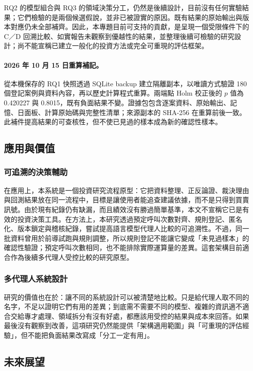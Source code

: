 \documentclass[12pt,a4paper]{article}
\numberwithin{table}{section}
\numberwithin{figure}{section}
\begin{document}
RQ2 的模型組合與 RQ3 的領域決策分工，仍然是後續設計，目前沒有任何實驗結果；它們檢驗的是兩個候選假說，並非已被證實的原因。既有結果的原始輸出與版本對應仍未全部補齊。因此，本專題目前可支持的貢獻，是呈現一個受限條件下的 C／D 回溯比較、如實報告未觀察到優越性的結果，並整理後續可檢驗的研究設計；尚不能宣稱已建立一般化的投資方法或完全可重現的評估框架。

\paragraph{2026 年 10 月 15 日重算補記。} 從本機保存的 RQ1 快照透過 SQLite backup 建立隔離副本，以唯讀方式驗證 180 個登記案例與資料內容，再以歷史計算程式重算。兩端點 Holm 校正後的 $p$ 值為 0.420227 與 0.8015，既有負面結果不變。證據包包含逐案資料、原始輸出、記憶、日面板、計算原始碼與完整性清單；來源副本的 SHA-256 在重算前後一致。此補件提高結果的可查核性，但不使已見過的樣本成為新的確認性樣本。

\subsection{應用與價值}

\subsubsection{可追溯的決策輔助}
在應用上，本系統是一個投資研究流程原型：它把資料整理、正反論證、裁決理由與回測結果放在同一流程中，目標是讓使用者能追查建議依據，而不是只得到買賣訊號。由於現有紀錄仍有缺漏，而且績效沒有勝過簡單基準，本文不宣稱它已是有效的投資決策工具。在方法上，本研究透過預定呼叫次數對齊、規則登記、匿名化、版本鎖定與稽核紀錄，嘗試提高語言模型代理人比較的可追溯性。不過，同一批資料曾用於前導試跑與規則調整，所以規則登記不能讓它變成「未見過樣本」的確認性驗證；預定呼叫次數相同，也不能排除實際運算量的差異。這套架構目前適合作為後續多代理人受控比較的研究原型。
\subsubsection{多代理人系統設計}

研究的價值也在於：讓不同的系統設計可以被清楚地比較。只是給代理人取不同的名字，不足以證明它們有用的差異；到底需不需要不同的模型、複雜的資訊適不適合交給專才處理、領域拆分有沒有好處，都應該用受控的結果與成本來回答。如果最後沒有觀察到改善，這項研究仍然能提供「架構適用範圍」與「可重現的評估經驗」，但不能把負面結果改寫成「分工一定有用」。

\subsection{未來展望}
\end{document}
